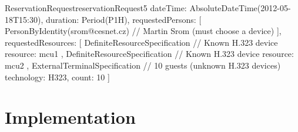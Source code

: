 \begin{enumerate}
\begin{EntityExample}{ReservationRequest}{reservationRequest5}{}
dateTime: AbsoluteDateTime(2012-05-18T15:30), duration: Period(P1H),
requestedPersons: [
  PersonByIdentity(srom@cesnet.cz) // Martin Srom (must choose a device)
],
requestedResources: [
  DefiniteResourceSpecification { // Known H.323 device
    resource: mcu1
  },
  DefiniteResourceSpecification { // Known H.323 device
    resource: mcu2
  },
  ExternalTerminalSpecification { // 10 guests (unknown H.323 devices)
    technology: H323,
    count: 10
  }
]
\end{EntityExample}

\end{enumerate}


\section{Implementation}

